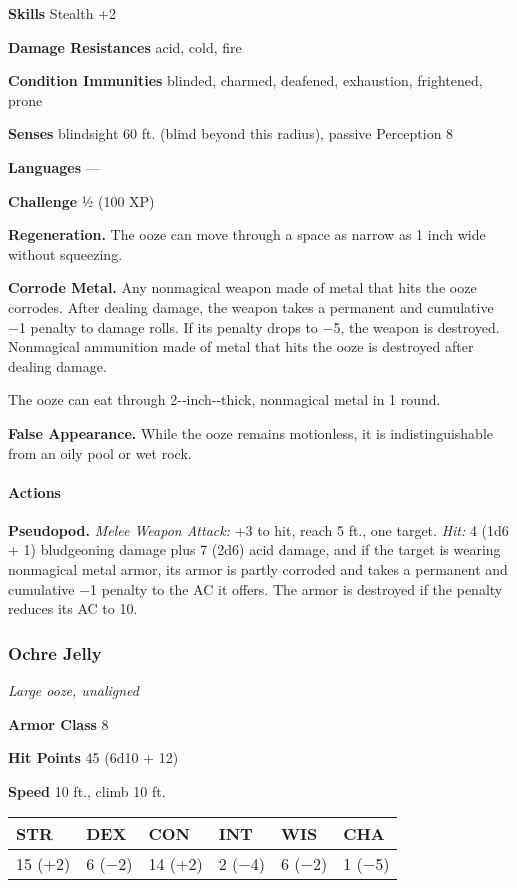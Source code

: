 \documentclass[
]{article}
\begin{document}
\textbf{Skills} Stealth +2

\textbf{Damage Resistances} acid, cold, fire

\textbf{Condition Immunities} blinded, charmed, deafened, exhaustion,
frightened, prone

\textbf{Senses} blindsight 60 ft. (blind beyond this radius), passive
Perception 8

\textbf{Languages} ---

\textbf{Challenge} ½ (100 XP)

\textbf{Regeneration.} The ooze can move through a space as narrow as 1
inch wide without squeezing.

\textbf{Corrode Metal.} Any nonmagical weapon made of metal that hits
the ooze corrodes. After dealing damage, the weapon takes a permanent
and cumulative −1 penalty to damage rolls. If its penalty drops to −5,
the weapon is destroyed. Nonmagical ammunition made of metal that hits
the ooze is destroyed after dealing damage.

The ooze can eat through 2-­‐inch-­‐thick, nonmagical metal in 1 round.

\textbf{False Appearance.} While the ooze remains motionless, it is
indistinguishable from an oily pool or wet rock.

\hypertarget{actions-4}{%
\paragraph{Actions}\label{actions-4}}

\textbf{Pseudopod.} \emph{Melee Weapon Attack:} +3 to hit, reach 5 ft.,
one target. \emph{Hit:} 4 (1d6 + 1) bludgeoning damage plus 7 (2d6) acid
damage, and if the target is wearing nonmagical metal armor, its armor
is partly corroded and takes a permanent and cumulative −1 penalty to
the AC it offers. The armor is destroyed if the penalty reduces its AC
to 10.

\hypertarget{ochre-jelly}{%
\subsubsection{Ochre Jelly}\label{ochre-jelly}}

\emph{Large ooze, unaligned}

\textbf{Armor Class} 8

\textbf{Hit Points} 45 (6d10 + 12)

\textbf{Speed} 10 ft., climb 10 ft.

\begin{longtable}[]{@{}llllll@{}}
\toprule
STR & DEX & CON & INT & WIS & CHA\tabularnewline
\midrule
\endhead
15 (+2) & 6 (−2) & 14 (+2) & 2 (−4) & 6 (−2) & 1 (−5)\tabularnewline
\bottomrule
\end{longtable}
\end{document}
